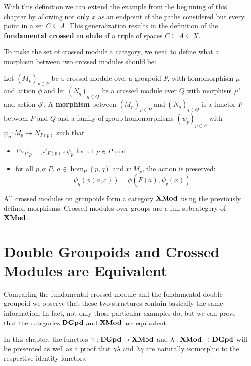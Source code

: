 With this definition we can extend the example from the beginning of this
chapter by allowing not only $x$ as an endpoint of the paths considered but every
point in a set $C \subseteq A$.
This generalization results in the definition of the \textbf{fundamental crossed
module} of a triple of spaces $C \subseteq A \subseteq X$.

To make the set of crossed module a category, we need to define what a morphism
between two crossed modules should be:

\begin{defn}
Let $(M_p)_{p \in P}$ be a crossed module over a groupoid $P$, with homomorphism
$\mu$ and action $\phi$ and let $(N_q)_{q \in Q}$ be a crossed module over $Q$
with morphism $\mu'$ and action $\phi'$.
A \textbf{morphism} between $(M_p)_{p \in P}$ and $(N_q)_{q \in Q}$ is a functor $F$
between $P$ and $Q$ and a family of group homomorphisms $(\psi_p)_{p \in P}$ 
with $\psi_p : M_p \to N_{F(p)}$ such that
\begin{itemize}
\item $F \circ \mu_p = \mu'_{F(p)} \circ \psi_p$ for all $p \in P$ and
\item for all $p, q : P$, $a \in \hom_P(p,q)$ and $x : M_p$, the action is preserved:
\begin{equation*}
\psi_q(\phi(a,x)) = \phi(F(a),\psi_p(x)) \text{.}
\end{equation*}
\end{itemize}
\end{defn}

\begin{defn}
All crossed modules on groupoids form a category $\mathbf{XMod}$ using the previously
defined morphisms. Crossed modules over groups are a full subcategory of $\mathbf{XMod}$.
\end{defn}

\section{Double Groupoids and Crossed Modules are Equivalent}

Comparing the fundamental crossed module and the fundamental double groupoid we
observe that these two structures contain basically the same information.
In fact, not only those particular examples do, but we can prove that the categories
$\mathbf{DGpd}$ and $\mathbf{XMod}$ are equivalent.

In this chapter, the functors $\gamma : \mathbf{DGpd} \to \mathbf{XMod}$ and
$\lambda : \mathbf{XMod} \to \mathbf{DGpd}$ will be presented as well as a proof that $\gamma \lambda$
and $\lambda \gamma$ are naturally isomorphic to the respective identity functors.

